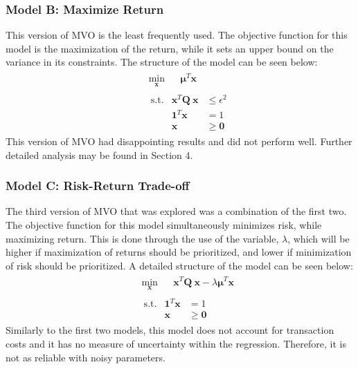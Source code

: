 \documentclass[10pt]{article}
\begin{document}
\subsubsection{Model B: Maximize Return}
\label{sec:modelB}
This version of MVO is the least frequently used. The objective function for this model is the maximization of the return, while it sets an upper bound on the variance in its constraints. The structure of the model can be seen below:
\[
\begin{aligned}
&\begin{aligned}
    & \min_{\bm{x}}     && \bm{\mu}^T \bm{x} 
\end{aligned} \\
&\begin{aligned}
    &\ \mathrm{s.t.}    &\bm{x}^T \bm{Q}\ \bm{x} &\leq \epsilon^2 \\
    &                   & \bm{1}^T \bm{x} &= 1 \\
    &                   & \bm{x} &\geq \bm{0}
\end{aligned}
\end{aligned}
\]
This version of MVO had disappointing results and did not perform well. Further detailed analysis may be found in Section 4.

\subsubsection{Model C: Risk-Return Trade-off}
\label{sec:modelC}
The third version of MVO that was explored was a combination of the first two. The objective function for this model simultaneously minimizes risk, while maximizing return. This is done through the use of the variable,  $\lambda$, which will be higher if maximization of returns should be prioritized, and lower if minimization of risk should be prioritized. A detailed structure of the model can be seen below:
\[
\begin{aligned}
&\begin{aligned}
    & \min_{\bm{x}}     &&\bm{x}^T \bm{Q}\ \bm{x} -  \lambda \bm{\mu}^T \bm{x} 
\end{aligned} \\
&\begin{aligned}
    &\ \mathrm{s.t.}        & \bm{1}^T \bm{x} &= 1 \\
    &                   & \bm{x} &\geq \bm{0}
\end{aligned}
\end{aligned}
\]
Similarly to the first two models, this model does not account for transaction costs and it has no measure of uncertainty within the regression. Therefore, it is not as reliable with noisy parameters.
\end{document}
